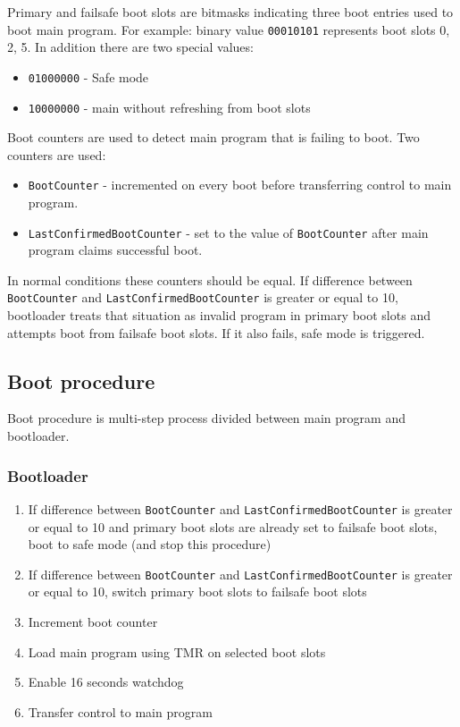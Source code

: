 Primary and failsafe boot slots are bitmasks indicating three boot entries used to boot main \obc program. For example: binary value \texttt{00010101} represents boot slots 0, 2, 5. In addition there are two special values:
\begin{itemize}
	\item \texttt{01000000} - Safe mode
	\item \texttt{10000000} - \obc main without refreshing from boot slots
\end{itemize}

Boot counters are used to detect main \obc program that is failing to boot. Two counters are used: 
\begin{itemize}
	\item \texttt{BootCounter} - incremented on every boot before transferring control to main \obc program.
	\item \texttt{LastConfirmedBootCounter} - set to the value of \texttt{BootCounter} after main \obc program claims successful boot.
\end{itemize}

In normal conditions these counters should be equal. If difference between \texttt{BootCounter} and \texttt{LastConfirmedBootCounter} is greater or equal to 10, bootloader treats that situation as invalid program in primary boot slots and attempts boot from failsafe boot slots. If it also fails, safe mode is triggered.

\subsection{Boot procedure}
Boot procedure is multi-step process divided between main \obc program and bootloader.

\subsubsection{Bootloader}
\begin{enumerate}
	\item If difference between \texttt{BootCounter} and \texttt{LastConfirmedBootCounter} is greater or equal to 10 and primary boot slots are already set to failsafe boot slots, boot to safe mode (and stop this procedure)
	\item If difference between \texttt{BootCounter} and \texttt{LastConfirmedBootCounter} is greater or equal to 10, switch primary boot slots to failsafe boot slots
	\item Increment boot counter
	\item Load main \obc program using TMR on selected boot slots
	\item Enable 16 seconds watchdog
	\item Transfer control to main \obc program
\end{enumerate}

